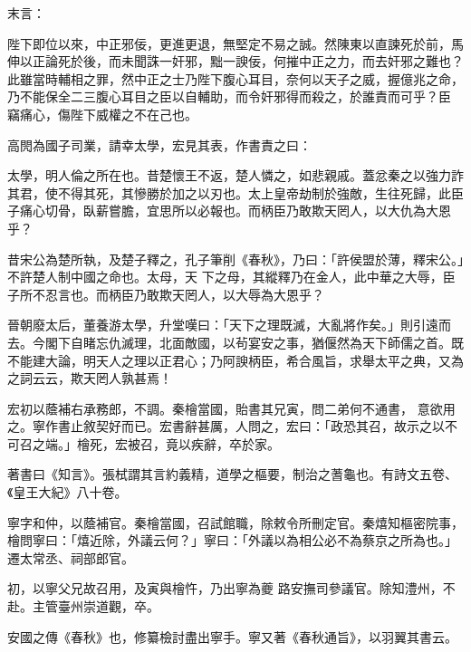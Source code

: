 \begin{pinyinscope}
 末言：



 陛下即位以來，中正邪佞，更進更退，無堅定不易之誠。然陳東以直諫死於前，馬伸以正論死於後，而未聞誅一奸邪，黜一諛佞，何摧中正之力，而去奸邪之難也？此雖當時輔相之罪，然中正之士乃陛下腹心耳目，奈何以天子之威，握億兆之命，乃不能保全二三腹心耳目之臣以自輔助，而令奸邪得而殺之，於誰責而可乎？臣
 竊痛心，傷陛下威權之不在己也。



 高閌為國子司業，請幸太學，宏見其表，作書責之曰：



 太學，明人倫之所在也。昔楚懷王不返，楚人憐之，如悲親戚。蓋忿秦之以強力詐其君，使不得其死，其慘勝於加之以刃也。太上皇帝劫制於強敵，生往死歸，此臣子痛心切骨，臥薪嘗膽，宜思所以必報也。而柄臣乃敢欺天罔人，以大仇為大恩乎？



 昔宋公為楚所執，及楚子釋之，孔子筆削《春秋》，乃曰：「許侯盟於薄，釋宋公。」不許楚人制中國之命也。太母，天
 下之母，其縱釋乃在金人，此中華之大辱，臣子所不忍言也。而柄臣乃敢欺天罔人，以大辱為大恩乎？



 晉朝廢太后，董養游太學，升堂嘆曰：「天下之理既滅，大亂將作矣。」則引遠而去。今閣下自睹忘仇滅理，北面敵國，以茍宴安之事，猶偃然為天下師儒之首。既不能建大論，明天人之理以正君心；乃阿諛柄臣，希合風旨，求舉太平之典，又為之詞云云，欺天罔人孰甚焉！



 宏初以蔭補右承務郎，不調。秦檜當國，貽書其兄寅，問二弟何不通書，
 意欲用之。寧作書止敘契好而已。宏書辭甚厲，人問之，宏曰：「政恐其召，故示之以不可召之端。」檜死，宏被召，竟以疾辭，卒於家。



 著書曰《知言》。張栻謂其言約義精，道學之樞要，制治之蓍龜也。有詩文五卷、《皇王大紀》八十卷。



 寧字和仲，以蔭補官。秦檜當國，召試館職，除敕令所刪定官。秦熺知樞密院事，檜問寧曰：「熺近除，外議云何？」寧曰：「外議以為相公必不為蔡京之所為也。」遷太常丞、祠部郎官。



 初，以寧父兄故召用，及寅與檜忤，乃出寧為夔
 路安撫司參議官。除知澧州，不赴。主管臺州崇道觀，卒。



 安國之傳《春秋》也，修纂檢討盡出寧手。寧又著《春秋通旨》，以羽翼其書云。



\end{pinyinscope}